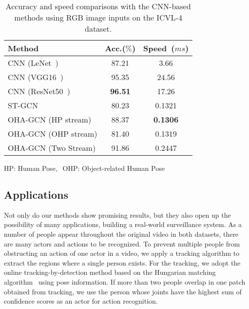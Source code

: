 \documentclass[10pt,twocolumn,letterpaper]{article}
\begin{document}
\begin{table}
\caption{Accuracy and speed comparisons with the CNN-based methods using RGB image inputs on the ICVL-4 dataset.}
\vspace{3mm}
\centering
\begin{tabular}{p{4cm}|cc} 

\hline 

Method & Acc.($\%$) & Speed~($ms$)  \\ \hline 

CNN (LeNet~\cite{lecun1998gradient}) &  87.21 &  3.66 \\ 
CNN (VGG16~\cite{simonyan2014very}) &  95.35 &  24.56  \\ 
CNN (ResNet50~\cite{he2016deep}) &  \textbf{96.51} & 17.26 \\  \hline
ST-GCN~\cite{stgcn2018aaai} & 80.23 & 0.1321 \\ \hline
OHA-GCN (HP stream) & 88.37 & \textbf{0.1306} \\ 
OHA-GCN (OHP stream) & 81.40 & 0.1319 \\ 
OHA-GCN (Two Stream) & 91.86  & 0.2447 \\ \hline 
\end{tabular}
{HP: Human Pose,$~~$ OHP: Object-related Human Pose}
\label{tabular:res_icvl}
\end{table}





\subsection{Applications}
\label{application}

Not only do our methods show promising results, but they also open up the possibility of many applications, building a real-world surveillance system. 
As a number of people appear throughout the original video in both datasets, there are many actors and actions to be recognized.
To prevent multiple people from obstructing an action of one actor in a video, we apply a tracking algorithm to extract the regions where a single person exists.
For the tracking, we adopt the online tracking-by-detection method based on the Hungarian matching algorithm~\cite{Yoo:2016cf} using pose information.
If more than two people overlap in one patch obtained from tracking, we use the person whose joints have the highest sum of confidence scores as an actor for action recognition.
\end{document}
